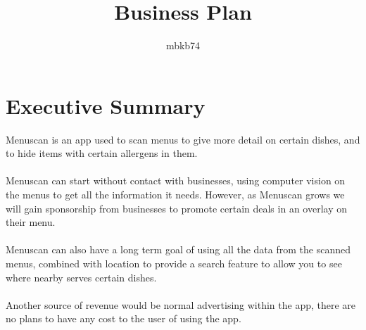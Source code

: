 \documentclass{article}[18pt]
\title{Business Plan}
\author{mbkb74}
\begin{document}
\maketitle
	
\tableofcontents
\newpage
\section{Executive Summary}
Menuscan is an app used to scan menus to give more detail on certain dishes, and to hide items with certain allergens in them.\\
\\
Menuscan can start without contact with businesses, using computer vision on the menus to get all the information it needs. However, as Menuscan grows we will gain sponsorship from businesses to promote certain deals in an overlay on their menu.\\
\\
Menuscan can also have a long term goal of using all the data from the scanned menus, combined with location to provide a search feature to allow you to see where nearby serves certain dishes.\\
\\
Another source of revenue would be normal advertising within the app, there are no plans to have any cost to the user of using the app.
\end{document}
